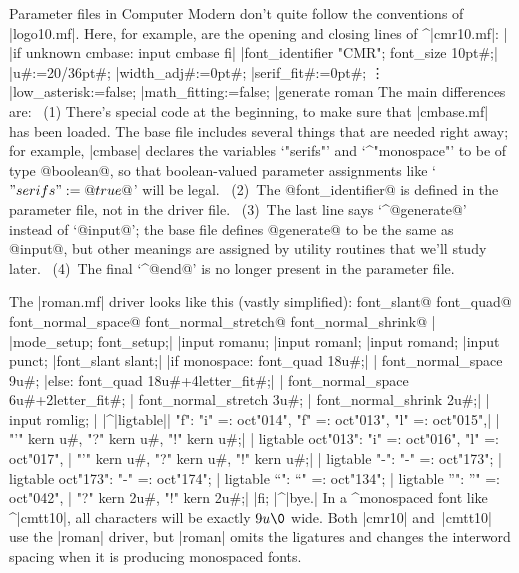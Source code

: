 Parameter files in Computer Modern don't quite follow the conventions
of\/ |logo10.mf|. Here, for example, are the
opening and closing lines of ^|cmr10.mf|:
\beginlines
|%
|if unknown cmbase: input cmbase fi|
\smallskip
|font_identifier "CMR"; font_size 10pt#;|
\smallskip
|u#:=20/36pt#;             %
|width_adj#:=0pt#;         %
|serif_fit#:=0pt#;         %
\vskip-3pt
\qquad\vdots
|low_asterisk:=false;      %
|math_fitting:=false;      %
\smallskip
|generate roman            %
\endlines
The main differences are: \ (1) There's special code at the beginning, to
make sure that |cmbase.mf| has been loaded. The base file includes
several things that are needed right away; for example, |cmbase| declares
the variables `"serifs"' and `^"monospace"' to be of type @boolean@,
so that boolean-valued parameter assignments like `$"serifs":=@true@$'
will be legal. \ (2)~The @font\_identifier@ is defined in the parameter file,
not in the driver file. \ (3)~The last line says `^@generate@' instead of
`@input@'; the base file defines @generate@ to be the same as @input@,
but other meanings are assigned by utility routines that we'll study later.
\ (4)~The final `^@end@' is no longer present in the parameter file.

The |roman.mf| driver looks like this (vastly simplified):
^^@font\_slant@ ^^@font\_quad@ ^^@font\_normal\_space@
^^@font\_normal\_stretch@ ^^@font\_normal\_shrink@
\beginlines
|%
\smallskip
|mode_setup; font_setup;|
\smallskip
|input romanu;                         %
|input romanl;                         %
|input romand;                         %
|input punct;                          %
\smallskip
|font_slant slant;|
|if monospace: font_quad 18u#;|
| font_normal_space 9u#;               %
|else: font_quad 18u#+4letter_fit#;|
| font_normal_space 6u#+2letter_fit#;  %
| font_normal_stretch 3u#;             %
| font_normal_shrink 2u#;|
| input romlig;                        %
| |^|ligtable|| "f": "i" =: oct"014", "f" =: oct"013", "l" =: oct"015",|
|            "'" kern u#, "?" kern u#, "!" kern u#;|
| ligtable oct"013": "i" =: oct"016", "l" =: oct"017",   %
|            "'" kern u#, "?" kern u#, "!" kern u#;|
| ligtable "-": "-" =: oct"173";                         %
| ligtable oct"173": "-" =: oct"174";                    %
| ligtable "`": "`" =: oct"134";                         %
| ligtable "'": "'" =: oct"042",                         %
|            "?" kern 2u#, "!" kern 2u#;|
|fi; |^|bye.|
\endlines
In a ^{monospaced} font like ^|cmtt10|, all characters will be exactly
$9u\0$ wide. Both |cmr10| and~|cmtt10| use the |roman| driver, but
|roman| omits the ligatures and changes the interword spacing
when it is producing monospaced fonts.

